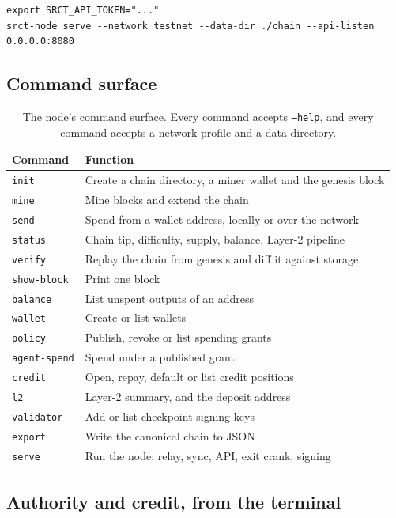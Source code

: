 \documentclass{article}
\begin{document}
\begin{verbatim}
export SRCT_API_TOKEN="..."
srct-node serve --network testnet --data-dir ./chain --api-listen 0.0.0.0:8080
\end{verbatim}

\subsection{Command surface}

\begin{table}[htbp]
\centering
\begin{tabular}{ll}
\toprule
\textbf{Command} & \textbf{Function} \\
\midrule
\texttt{init} & Create a chain directory, a miner wallet and the genesis block \\
\texttt{mine} & Mine blocks and extend the chain \\
\texttt{send} & Spend from a wallet address, locally or over the network \\
\texttt{status} & Chain tip, difficulty, supply, balance, Layer-2 pipeline \\
\texttt{verify} & Replay the chain from genesis and diff it against storage \\
\texttt{show-block} & Print one block \\
\texttt{balance} & List unspent outputs of an address \\
\texttt{wallet} & Create or list wallets \\
\texttt{policy} & Publish, revoke or list spending grants \\
\texttt{agent-spend} & Spend under a published grant \\
\texttt{credit} & Open, repay, default or list credit positions \\
\texttt{l2} & Layer-2 summary, and the deposit address \\
\texttt{validator} & Add or list checkpoint-signing keys \\
\texttt{export} & Write the canonical chain to JSON \\
\texttt{serve} & Run the node: relay, sync, API, exit crank, signing \\
\bottomrule
\end{tabular}
\caption{The node's command surface. Every command accepts \texttt{--help}, and
every command accepts a network profile and a data directory.}
\label{tab:cli}
\end{table}

\subsection{Authority and credit, from the terminal}
\end{document}
